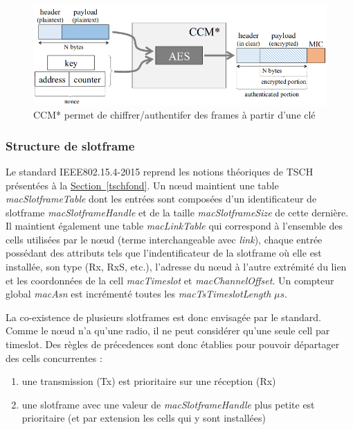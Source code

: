 \documentclass[]{report}
\newcommand{\wordlink}[2]{\hyperref[#2]{#1~\ref{#2}}}
\begin{document}
	\begin{figure}[!ht]
	\centering
	\includegraphics[width=0.7\linewidth]{CCM}
	\caption{CCM* permet de chiffrer/authentifer des frames à partir d'une clé \cite{link-layer-sec-impact}}
	\label{fig:CCM}
	\end{figure}

\newpage


\subsubsection{Structure de slotframe}

Le standard IEEE802.15.4-2015 \cite{IEEE802.15.4} reprend les notions théoriques de TSCH présentées à la \wordlink{Section}{tschfond}. Un nœud maintient une table \textit{macSlotframeTable} dont les entrées sont composées d'un identificateur de slotframe \textit{macSlotframeHandle} et de la taille \textit{macSlotframeSize} de cette dernière. Il maintient également une table \textit{macLinkTable} qui correspond à l'ensemble des cells utilisées par le nœud (terme interchangeable avec \textit{link}), chaque entrée possédant des attributs tels que l'indentificateur de la slotframe où elle est installée, son type (Rx, RxS, etc.), l'adresse du nœud à l'autre extrémité du lien et les coordonnées de la cell \textit{macTimeslot} et \textit{macChannelOffset}. Un compteur global \textit{macAsn} est incrémenté toutes les \textit{macTsTimeslotLength} $\mu s$.\\

\par La co-existence de plusieurs slotframes est donc envisagée par le standard. Comme le nœud n'a qu'une radio, il ne peut considérer qu'une seule cell par timeslot. Des règles de précedences sont donc établies pour pouvoir départager des cells concurrentes :
\vspace{0.1cm}
\begin{enumerate}
\item une transmission (Tx) est prioritaire sur une réception (Rx)
\vspace{0.1cm}
\item une slotframe avec une valeur de \textit{macSlotframeHandle} plus petite est prioritaire (et par extension les cells qui y sont installées)
\end{enumerate}
\end{document}
